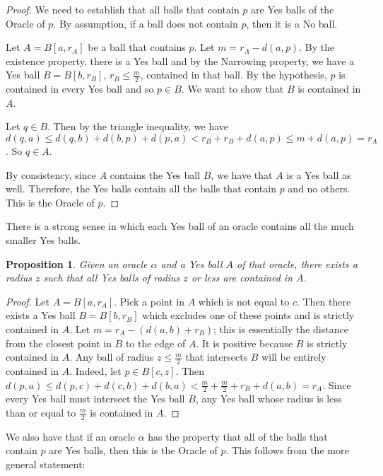\documentclass[12pt]{article}
\newtheorem{proposition}{Proposition}[section]
\begin{document}
\begin{proof}
We need to establish that all balls that contain $p$ are Yes balls of the Oracle of $p$. By assumption, if a ball does not contain $p$, then it is a No ball. 

Let $A = B[a, r_A]$ be a ball that contains $p$. Let $m = r_A - d(a,p)$. By the existence property, there is a Yes ball and by the Narrowing property, we have a Yes ball $B = B[b, r_B]$, $r_B \leq \frac{m}{2}$, contained in that ball. By the hypothesis, $p$ is contained in every Yes ball and so $p \in B$. We want to show that $B$ is contained in $A$. 

Let $q \in B$. Then by the triangle inequality, we have $d(q, a) \leq d(q, b) + d(b, p) +  d(p,a) < r_B + r_B + d(a,p) \leq m + d(a,p) = r_A$. So $q \in A$. 

By consistency, since $A$ contains the Yes ball $B$, we have that $A$ is a Yes ball as well. Therefore, the Yes balls contain all the balls that contain $p$ and no others. This is the Oracle of $p$. 
\end{proof}



There is a strong sense in which each Yes ball of an oracle contains all the much smaller Yes balls. 

\begin{proposition}
    Given an oracle $\alpha$ and a Yes ball $A$ of that oracle, there exists a radius $z$ such that all Yes balls of radius $z$ or less are contained in $A$. 
\end{proposition}

\begin{proof}
Let $A = B[a, r_A]$. Pick a point in $A$ which is not equal to $c$. Then there exists a Yes ball $B = B[b,r_B]$ which excludes one of these points and is strictly contained in $A$. Let $m = r_A - (d(a,b) + r_B)$; this is essentially the distance from the closest point in $B$ to the edge of $A$. It is positive because $B$ is strictly contained in $A$.  Any ball of radius $z \leq \frac{m}{2}$ that intersects $B$ will be entirely contained in $A$. Indeed, let $p \in B[c, z]$. Then $d(p, a) \leq d(p, c) + d(c, b) + d(b, a) < \frac{m}{2} + \frac{m}{2}+ r_B + d(a,b) = r_A$. Since every Yes ball must intersect the Yes ball $B$, any Yes ball whose radius is less than or equal to $\frac{m}{2}$ is contained in $A$. 
\end{proof}


We also have that if an oracle $\alpha$ has the property that all of the balls that contain $p$ are Yes balls, then this is the Oracle of $p$. This follows from the more general statement: 
\end{document}
